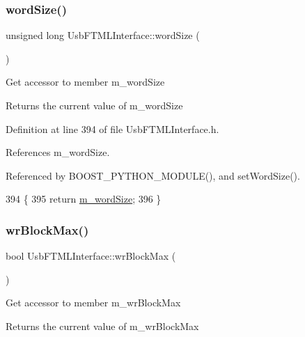 \subsubsection{\texorpdfstring{word\+Size()}{wordSize()}}
{\footnotesize\ttfamily unsigned long Usb\+F\+T\+M\+L\+Interface\+::word\+Size (\begin{DoxyParamCaption}{ }\end{DoxyParamCaption})\hspace{0.3cm}{\ttfamily [inline]}}

Get accessor to member m\+\_\+word\+Size \begin{DoxyReturn}{Returns}
the current value of m\+\_\+word\+Size 
\end{DoxyReturn}


Definition at line 394 of file Usb\+F\+T\+M\+L\+Interface.\+h.



References m\+\_\+word\+Size.



Referenced by B\+O\+O\+S\+T\+\_\+\+P\+Y\+T\+H\+O\+N\+\_\+\+M\+O\+D\+U\+L\+E(), and set\+Word\+Size().


\begin{DoxyCode}
394                             \{
395     \textcolor{keywordflow}{return} \hyperlink{classUsbFTMLInterface_a39a8dfbe54cc29e033fa2a4d5fbbc982}{m\_wordSize};
396   \}  
\end{DoxyCode}
\mbox{\label{classUsbFTMLInterface_a296da37a9d4c2d78338800ebc283bb80}} 
\subsubsection{\texorpdfstring{wr\+Block\+Max()}{wrBlockMax()}}
{\footnotesize\ttfamily bool Usb\+F\+T\+M\+L\+Interface\+::wr\+Block\+Max (\begin{DoxyParamCaption}{ }\end{DoxyParamCaption})\hspace{0.3cm}{\ttfamily [inline]}}

Get accessor to member m\+\_\+wr\+Block\+Max \begin{DoxyReturn}{Returns}
the current value of m\+\_\+wr\+Block\+Max 
\end{DoxyReturn}


